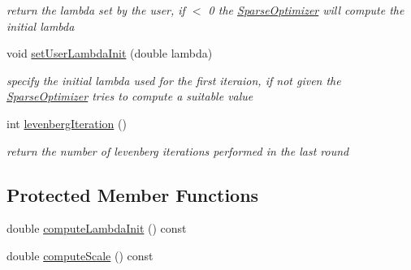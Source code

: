 \begin{DoxyCompactItemize}
\begin{DoxyCompactList}\small\item\em return the lambda set by the user, if $<$ 0 the \hyperlink{classg2o_1_1SparseOptimizer}{Sparse\+Optimizer} will compute the initial lambda \end{DoxyCompactList}\item 
void \hyperlink{classg2o_1_1OptimizationAlgorithmLevenberg_a9388e5e7800b18acb0db0a9a7be031a6}{set\+User\+Lambda\+Init} (double lambda)
\begin{DoxyCompactList}\small\item\em specify the initial lambda used for the first iteraion, if not given the \hyperlink{classg2o_1_1SparseOptimizer}{Sparse\+Optimizer} tries to compute a suitable value \end{DoxyCompactList}\item 
int \hyperlink{classg2o_1_1OptimizationAlgorithmLevenberg_a6d458d8a89069fab92fab75c1255a523}{levenberg\+Iteration} ()
\begin{DoxyCompactList}\small\item\em return the number of levenberg iterations performed in the last round \end{DoxyCompactList}\end{DoxyCompactItemize}
\subsection*{Protected Member Functions}
\begin{DoxyCompactItemize}
\item 
double \hyperlink{classg2o_1_1OptimizationAlgorithmLevenberg_a84d860857af44977ab5358527475ce54}{compute\+Lambda\+Init} () const 
\item 
double \hyperlink{classg2o_1_1OptimizationAlgorithmLevenberg_a3938bf95baa0088f9cd4b56a19540c90}{compute\+Scale} () const 
\end{DoxyCompactItemize}
